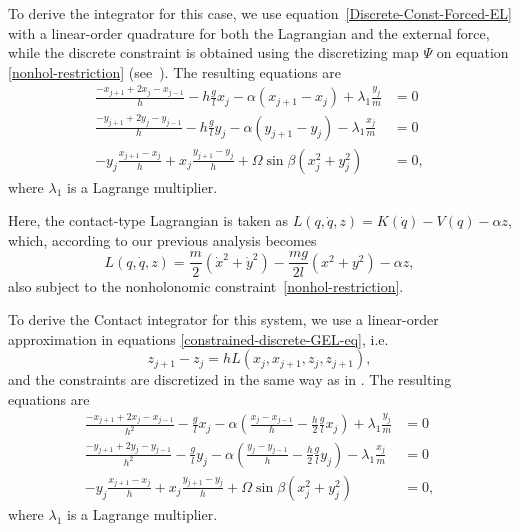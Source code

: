 \documentclass{aims}
\numberwithin{equation}{section}
\theoremstyle{definition}
\begin{document}
To derive the integrator for this case, we use equation~\eqref{Discrete-Const-Forced-EL} with a linear-order quadrature for both the Lagrangian and the external force, while the discrete constraint is obtained using the discretizing map $\Psi$ on equation \eqref{nonhol-restriction} (see~\cite{cortes2001non}). The resulting equations are
\begin{equation}
\begin{split}
  \frac{- x_{j+1} + 2 x_j - x_{j-1}}{h} - h \frac{g}{l} x_j - \alpha ( x_{j+1} - x_j ) + \lambda_1 \frac{y_j}{m} &= 0 \\
  \frac{- y_{j+1} + 2 y_j - y_{j-1}}{h} - h \frac{g}{l} y_j - \alpha ( y_{j+1} - y_j ) - \lambda_1 \frac{x_j}{m} &= 0 \\
  - y_j \frac{x_{j+1} - x_j}{h} + x_j \frac{y_{j+1} - y_j}{h} + \Omega \sin \beta (x_j^2 + y_j^2) &= 0,
\end{split}
\end{equation}
where $\lambda_1$ is a Lagrange multiplier.

\vspace{12px}

 Here, the contact-type Lagrangian is taken as $L(q, \dot{q}, z) = K(\dot{q}) - V(q) - \alpha z$, which, according to our previous analysis becomes
\begin{equation} \label{eq:H-Foucault}
  L(q, \dot{q}, z) = \frac{m}{2} (\dot{x}^2 + \dot{y}^2) - 
  \frac{m g}{2 l} \left( x^2 + y^2 \right) - \alpha z,
\end{equation}
also subject to the nonholonomic constraint~\eqref{nonhol-restriction}.

To derive the Contact integrator for this system, we use a linear-order approximation in equations \eqref{constrained-discrete-GEL-eq}, i.e.
\begin{equation}
  z_{j+1} - z_j = h L(x_j, x_{j+1}, z_{j}, z_{j+1}),
\end{equation}
and the constraints are discretized in the same way as in \cite{cortes2001non}. The resulting
equations are
\begin{equation}
\begin{split}
  \frac{- x_{j+1} + 2 x_j - x_{j-1}}{h^2} - \frac{g}{l} x_j - \alpha \left( \frac{x_{j} - x_{j-1}}{h} - \frac{h}{2} \frac{g}{l} x_j \right) + \lambda_1 \frac{y_j}{m} &= 0 \\
  \frac{- y_{j+1} + 2 y_j - y_{j-1}}{h^2} - \frac{g}{l} y_j - \alpha \left( \frac{y_{j} - y_{j-1}}{h} - \frac{h}{2} \frac{g}{l} y_j \right) - \lambda_1 \frac{x_j}{m} &= 0 \\
  - y_j \frac{x_{j+1} - x_j}{h} + x_j \frac{y_{j+1} - y_j}{h} + \Omega \sin \beta (x_j^2 + y_j^2) &= 0,
\end{split}
\end{equation}
where $\lambda_1$ is a Lagrange multiplier.
\end{document}
